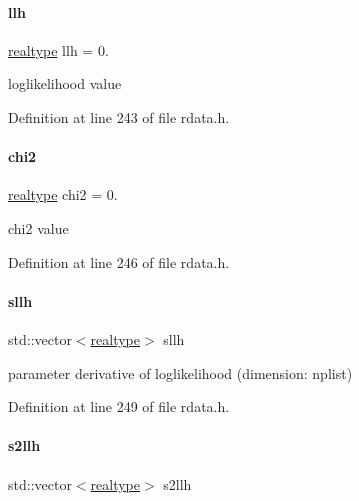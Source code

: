 \mbox{\label{classamici_1_1_return_data_a35c3d895b14746807521fa6ba8ead52b}} 
\paragraph{\texorpdfstring{llh}{llh}}
{\footnotesize\ttfamily \mbox{\hyperlink{namespaceamici_a1bdce28051d6a53868f7ccbf5f2c14a3}{realtype}} llh = 0.}

loglikelihood value 

Definition at line 243 of file rdata.\+h.

\mbox{\label{classamici_1_1_return_data_a473f438e422f5fbf6c5753a95b3324fe}} 
\paragraph{\texorpdfstring{chi2}{chi2}}
{\footnotesize\ttfamily \mbox{\hyperlink{namespaceamici_a1bdce28051d6a53868f7ccbf5f2c14a3}{realtype}} chi2 = 0.}

chi2 value 

Definition at line 246 of file rdata.\+h.

\mbox{\label{classamici_1_1_return_data_a1696cb94c7712b468ee3e021c6df0c89}} 
\paragraph{\texorpdfstring{sllh}{sllh}}
{\footnotesize\ttfamily std\+::vector$<$\mbox{\hyperlink{namespaceamici_a1bdce28051d6a53868f7ccbf5f2c14a3}{realtype}}$>$ sllh}

parameter derivative of loglikelihood (dimension\+: nplist) 

Definition at line 249 of file rdata.\+h.

\mbox{\label{classamici_1_1_return_data_a4087bea95b64c7ecc21bb4c487b255d9}} 
\paragraph{\texorpdfstring{s2llh}{s2llh}}
{\footnotesize\ttfamily std\+::vector$<$\mbox{\hyperlink{namespaceamici_a1bdce28051d6a53868f7ccbf5f2c14a3}{realtype}}$>$ s2llh}

